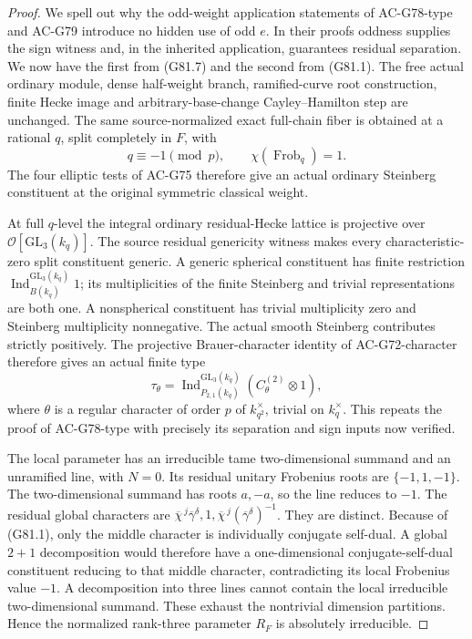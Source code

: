 \begin{proof}
We spell out why the odd-weight application statements of
AC-G78-type and AC-G79 introduce no hidden use of odd \(e\).
In their proofs oddness supplies the sign witness and, in the
inherited application, guarantees residual separation.
We now have the first from (G81.7) and the second from (G81.1).
The free actual ordinary module, dense half-weight branch,
ramified-curve root construction, finite Hecke image and
arbitrary-base-change Cayley--Hamilton step are unchanged.
The same source-normalized exact full-chain fiber is obtained
at a rational \(q\), split completely in \(F\), with
\[
 q\equiv-1\pmod p,\qquad
 \chi(\operatorname{Frob}_q)=1.
\]
The four elliptic tests of AC-G75 therefore give an actual
ordinary Steinberg constituent at the original symmetric
classical weight.

At full \(q\)-level the integral ordinary residual-Hecke
lattice is projective over \(\mathcal O[\mathrm{GL}_3(k_q)]\).
The source residual genericity witness makes every
characteristic-zero split constituent generic.
A generic spherical constituent has finite restriction
\(\operatorname{Ind}_{B(k_q)}^{\mathrm{GL}_3(k_q)}1\);
its multiplicities of the finite Steinberg and trivial
representations are both one.  A nonspherical constituent
has trivial multiplicity zero and Steinberg multiplicity
nonnegative.  The actual smooth Steinberg contributes
strictly positively.  The projective Brauer-character
identity of AC-G72-character therefore gives an actual
finite type
\[
 \tau_\theta=
 \operatorname{Ind}_{P_{2,1}(k_q)}^{\mathrm{GL}_3(k_q)}
       (C_\theta^{(2)}\otimes1),
\]
where \(\theta\) is a regular character of order \(p\) of
\(k_{q^2}^{\times}\), trivial on \(k_q^\times\).
This repeats the proof of AC-G78-type with precisely its
separation and sign inputs now verified.

The local parameter has an irreducible tame two-dimensional
summand and an unramified line, with \(N=0\).
Its residual unitary Frobenius roots are
\(\{-1,1,-1\}\).  The two-dimensional summand has roots
\(a,-a\), so the line reduces to \(-1\).
The residual global characters are
\(\overline\chi^{\,j}\overline\gamma^\delta,1,
 \overline\chi^{\,j}(\overline\gamma^\delta)^{-1}\).
They are distinct.  Because of (G81.1), only the middle
character is individually conjugate self-dual.
A global \(2+1\) decomposition would therefore have a
one-dimensional conjugate-self-dual constituent reducing to
that middle character, contradicting its local Frobenius
value \(-1\).  A decomposition into three lines cannot
contain the local irreducible two-dimensional summand.
These exhaust the nontrivial dimension partitions.
Hence the normalized rank-three parameter \(R_F\) is
absolutely irreducible.


\end{proof}
